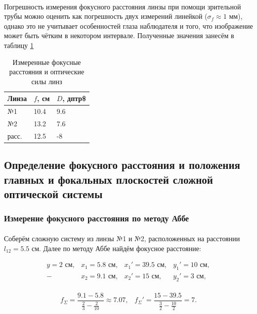 \documentclass[a4paper,12pt]{article} %
\begin{document}
\paragraph{} Погрешность измерения фокусного расстояния линзы при помощи зрительной трубы можно оценить как погрешность двух измерений линейкой ($\sigma_f \approx 1$ мм), однако это не учитывает особенностей глаза наблюдателя и того, что изображение может быть чётким в некотором интервале. Полученные значения занесём в таблицу \ref{tab:dptr}

\begin{table}[]
\centering
\begin{tabular}{|l|l|l|}
\hline
Линза & $f$, см & $D$, дптр\$ \\ \hline
№1    & 10.4    & 9.6         \\ \hline
№2    & 13.2    & 7.6         \\ \hline
расс. & 12.5    & -8          \\ \hline
\end{tabular}
\caption{Измеренные фокусные расстояния и оптические силы линз}
\label{tab:dptr}
\end{table}

\subsection{Определение фокусного расстояния и положения главных и фокальных плоскостей сложной оптической системы}

\subsubsection{Измерение фокусного расстояния по методу Аббе}

\paragraph{} Соберём сложную систему из линзы №1 и №2, расположенных на расстоянии $l_{12} = 5.5$ см. Далее по методу Аббе найдём фокусное расстояние:

\[
\begin{array}{llll}
y = 2 \text{ см}, 	& x_1 = 5.8 \text{ см},	& x_1' = 39.5 \text{ см}, & y_1' = 10 \text{ см}, \\
 - 					& x_2 = 9.1 \text{ см},	& x_2' = 15 \text{ см}, & y_2' = 3 \text{ см}, \\
\end{array}
\]

\[
f_\Sigma = \frac{9.1 - 5.8}{\frac{2}{3} - \frac{2}{10}} \approx 7.07, \;\;\;
f_\Sigma' = \frac{15 - 39.5}{\frac{3}{2} - \frac{10}{2}} = 7.
\]
\end{document}
